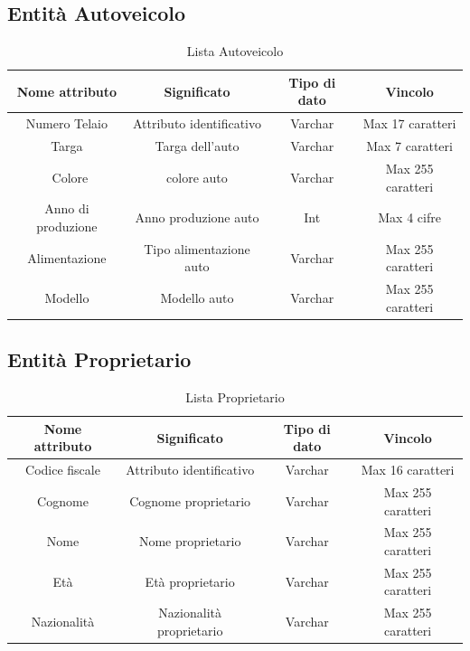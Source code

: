 \documentclass[12pt]{article}
\begin{document}

\subsection*{Entità Autoveicolo}
\begin{table}[h!]
    \centering
    \begin{tabular}{|c|c|c|c|}
        \hline
        Nome attributo & Significato & Tipo di dato & Vincolo \\
        \hline
        Numero Telaio & Attributo identificativo & Varchar & Max 17 caratteri \\
        \hline
        Targa & Targa dell'auto & Varchar & Max 7 caratteri \\
        \hline\
        Colore & colore auto & Varchar & Max 255 caratteri \\
        \hline
        Anno di produzione & Anno produzione auto & Int & Max 4 cifre \\
        \hline 
        Alimentazione & Tipo alimentazione auto & Varchar & Max 255 caratteri \\
        \hline
        Modello & Modello auto & Varchar & Max 255 caratteri \\
        \hline
    \end{tabular}
    \caption{Lista Autoveicolo}
    \label{tab:my_label}
\end{table}


\subsection*{Entità Proprietario}
\begin{table}[h!]
    \begin{tabular}{|c|c|c|c|}
        \hline
        Nome attributo & Significato & Tipo di dato & Vincolo \\
        \hline
        Codice fiscale & Attributo identificativo & Varchar & Max 16 caratteri \\
        \hline
        Cognome & Cognome proprietario & Varchar & Max 255 caratteri \\
        \hline
        Nome & Nome proprietario & Varchar & Max 255 caratteri \\
        \hline
        Età & Età proprietario & Varchar & Max 255 caratteri \\
        \hline
        Nazionalità & Nazionalità proprietario & Varchar & Max 255 caratteri \\
        \hline
    \end{tabular}
    \caption{Lista Proprietario}
    \label{tab:my_label}
\end{table}
\end{document}
